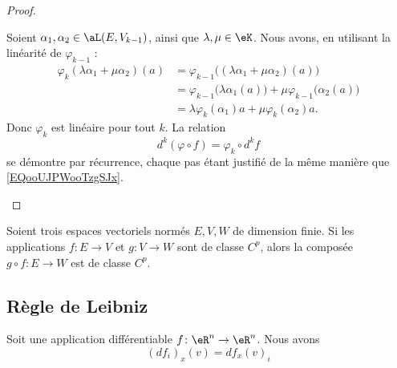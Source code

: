 \begin{proof}
	\begin{subproof}
		Soient \( \alpha_1,\alpha_2\in \aL(E,V_{k-1})\), ainsi que \( \lambda,\mu\in \eK\). Nous avons, en utilisant la linéarité de \( \varphi_{k-1}\) :
		\begin{subequations}
			\begin{align}
				\varphi_k(\lambda\alpha_1+\mu\alpha_2)(a) & =\varphi_{k-1}\big( (\lambda\alpha_1+\mu\alpha_2)(a) \big)                          \\
				                                          & =\varphi_{k-1}\big(\lambda \alpha_1(a)\big)+\mu\varphi_{k-1}\big( \alpha_2(a) \big) \\
				                                          & =\lambda\varphi_k(\alpha_1)a+\mu\varphi_k(\alpha_2)a.
			\end{align}
		\end{subequations}
		Donc \( \varphi_k\) est linéaire pour tout \( k\).
		\spitem[La relation]
		La relation
		\begin{equation}
			d^k(\varphi\circ f)=\varphi_k\circ d^kf
		\end{equation}
		se démontre par récurrence, chaque pas étant justifié de la même manière que \eqref{EQooUJPWooTzgSJx}.
	\end{subproof}
\end{proof}

\begin{proposition}[Composition]		\label{PROPooLRRMooRzrTNE}
	Soient trois espaces vectoriels normés \( E,V,W\) de dimension finie. Si les applications \(f \colon E\to V  \) et \( g \colon V\to W  \) sont de classe \( C^p\), alors la composée \(g\circ f \colon E\to W  \) est de classe \( C^p\).
\end{proposition}


\subsection{Règle de Leibniz}

\begin{proposition}	\label{PROPooNUAJooMtJByS}
	Soit une application différentiable \(f \colon \eR^n\to \eR^n  \). Nous avons
	\begin{equation}
		(df_i)_x(v)=df_x(v)_i
	\end{equation}
\end{proposition}



